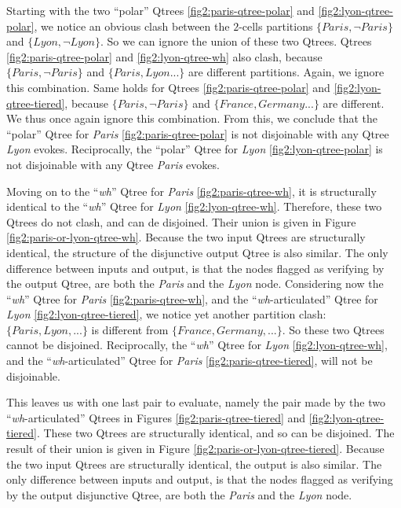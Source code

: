 Starting with the two ``polar'' Qtrees \ref{fig2:paris-qtree-polar} and \ref{fig2:lyon-qtree-polar}, we notice an obvious clash between the $2$-cells partitions $\lbrace \textit{Paris}, \neg\textit{Paris}\rbrace$ and $\lbrace \textit{Lyon}, \neg\textit{Lyon}\rbrace$. So we can ignore the union of these two Qtrees. Qtrees \ref{fig2:paris-qtree-polar} and \ref{fig2:lyon-qtree-wh} also clash, because $\lbrace \textit{Paris}, \neg\textit{Paris}\rbrace$ and $\lbrace \textit{Paris}, \textit{Lyon} ...\rbrace$ are different partitions. Again, we ignore this combination. Same holds for Qtrees \ref{fig2:paris-qtree-polar} and \ref{fig2:lyon-qtree-tiered}, because $\lbrace \textit{Paris}, \neg\textit{Paris}\rbrace$ and $\lbrace \textit{France}, \textit{Germany} ...\rbrace$ are different. We thus once again ignore this combination. From this, we conclude that the ``polar'' Qtree  for \textit{Paris} \ref{fig2:paris-qtree-polar} is not disjoinable with any Qtree \textit{Lyon} evokes. Reciprocally, the ``polar'' Qtree  for \textit{Lyon} \ref{fig2:lyon-qtree-polar} is not disjoinable with any Qtree \textit{Paris} evokes. 

Moving on to the ``\textit{wh}'' Qtree for \textit{Paris} \ref{fig2:paris-qtree-wh}, it is structurally identical to the ``\textit{wh}'' Qtree for \textit{Lyon} \ref{fig2:lyon-qtree-wh}. Therefore, these two Qtrees do not clash, and can de disjoined. Their union is given in Figure \ref{fig2:paris-or-lyon-qtree-wh}. Because the two input Qtrees are structurally identical, the structure of the disjunctive output Qtree is also similar. The only difference between inputs and output, is that the nodes flagged as verifying by the output Qtree, are both the \textit{Paris} and the \textit{Lyon} node. Considering now the ``\textit{wh}'' Qtree for \textit{Paris} \ref{fig2:paris-qtree-wh}, and the ``\textit{wh}-articulated'' Qtree for \textit{Lyon} \ref{fig2:lyon-qtree-tiered}, we notice yet another partition clash: $\lbrace \textit{Paris}, \textit{Lyon}, ...\rbrace$ is different from $\lbrace\textit{France}, \textit{Germany}, ... \rbrace$. So these two Qtrees cannot be disjoined. Reciprocally, the ``\textit{wh}'' Qtree for \textit{Lyon} \ref{fig2:lyon-qtree-wh}, and the ``\textit{wh}-articulated'' Qtree for \textit{Paris} \ref{fig2:paris-qtree-tiered}, will not be disjoinable.

This leaves us with one last pair to evaluate, namely the pair made by the two ``\textit{wh}-articulated'' Qtrees in Figures \ref{fig2:paris-qtree-tiered} and \ref{fig2:lyon-qtree-tiered}. These two Qtrees are structurally identical, and so can be disjoined. The result of their union is given in Figure \ref{fig2:paris-or-lyon-qtree-tiered}. Because the two input Qtrees are structurally identical, the output is also similar. The only difference between inputs and output, is that the nodes flagged as verifying by the output disjunctive Qtree, are both the \textit{Paris} and the \textit{Lyon} node.

